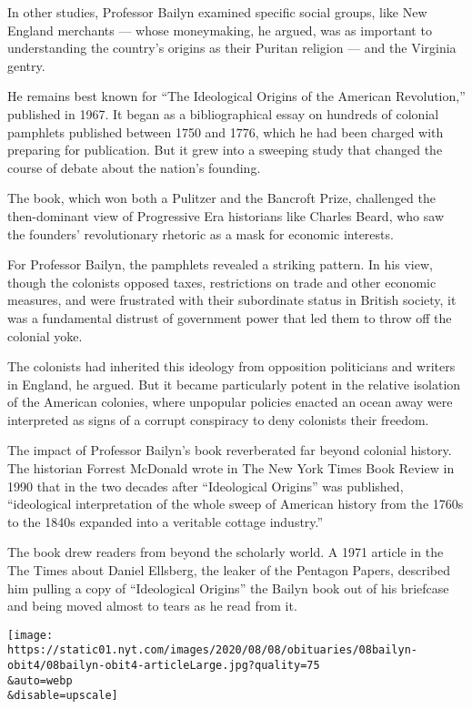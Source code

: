 In other studies, Professor Bailyn examined specific social groups, like
New England merchants --- whose moneymaking, he argued, was as important
to understanding the country's origins as their Puritan religion --- and
the Virginia gentry.

He remains best known for ``The Ideological Origins of the American
Revolution,'' published in 1967. It began as a bibliographical essay on
hundreds of colonial pamphlets published between 1750 and 1776, which he
had been charged with preparing for publication. But it grew into a
sweeping study that changed the course of debate about the nation's
founding.

The book, which won both a Pulitzer and the Bancroft Prize, challenged
the then-dominant view of Progressive Era historians like Charles Beard,
who saw the founders' revolutionary rhetoric as a mask for economic
interests.

For Professor Bailyn, the pamphlets revealed a striking pattern. In his
view, though the colonists opposed taxes, restrictions on trade and
other economic measures, and were frustrated with their subordinate
status in British society, it was a fundamental distrust of government
power that led them to throw off the colonial yoke.

The colonists had inherited this ideology from opposition politicians
and writers in England, he argued. But it became particularly potent in
the relative isolation of the American colonies, where unpopular
policies enacted an ocean away were interpreted as signs of a corrupt
conspiracy to deny colonists their freedom.

The impact of Professor Bailyn's book reverberated far beyond colonial
history. The historian Forrest McDonald wrote in The New York Times Book
Review in 1990 that in the two decades after ``Ideological Origins'' was
published, ``ideological interpretation of the whole sweep of American
history from the 1760s to the 1840s expanded into a veritable cottage
industry.''

The book drew readers from beyond the scholarly world. A 1971 article in
the The Times about Daniel Ellsberg, the leaker of the Pentagon Papers,
described him pulling a copy of ``Ideological Origins'' the Bailyn book
out of his briefcase and being moved almost to tears as he read from it.

\texttt{[image: https://static01.nyt.com/images/2020/08/08/obituaries/08bailyn-obit4/08bailyn-obit4-articleLarge.jpg?quality=75\\\&auto=webp\\\&disable=upscale]}

